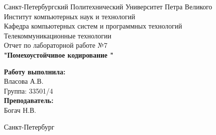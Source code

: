 \documentclass[a4paper]{article}
\begin{document}

\begin{titlepage}	%

	\begin{center}		%

		\large Санкт-Петербургский Политехнический Университет Петра Великого\\
		\large Институт компьютерных наук и технологий \\
		\large Кафедра компьютерных систем и программных технологий\\[6cm]
		
		\huge Телекоммуникационные технологии\\[0.5cm] %
		\large Отчет по лабораторной работе №7 \\[0.2cm]
		\large\textbf{"Помехоустойчивое кодирование
"}\\[5cm]

	\end{center}


	\begin{flushright} %
		\begin{minipage}{0.25\textwidth} %
			\begin{flushleft} %

				\large\textbf{Работу выполнила:}\\
				\large Власова А.В.\\
				\large {Группа:} 33501/4\\
				
				\large \textbf{Преподаватель:}\\
				\large Богач Н.В.\

			\end{flushleft}
		\end{minipage}
	\end{flushright}
	
	\vfill %

	\begin{center}
	\large Санкт-Петербург\\
	\large \the\year %
	\end{center} %

\thispagestyle{empty} %
\end{titlepage} %
\end{document}
